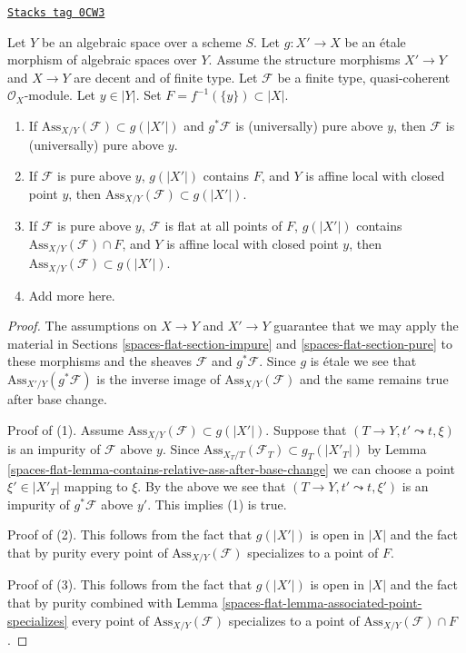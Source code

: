 \begin{lemma}
\label{spaces-flat-lemma-pure-on-top}
\href{https://stacks.math.columbia.edu/tag/0CW3}{\texttt{Stacks tag 0CW3}}

Let $Y$ be an algebraic space over a scheme $S$. Let $g : X' \to X$ be an
\'etale morphism of algebraic spaces over $Y$. Assume the structure
morphisms $X' \to Y$ and $X \to Y$ are decent and of finite type.
Let $\mathcal{F}$ be a finite type, quasi-coherent $\mathcal{O}_X$-module.
Let $y \in |Y|$. Set $F = f^{-1}(\{y\}) \subset |X|$.
\begin{enumerate}
\item If $\text{Ass}_{X/Y}(\mathcal{F}) \subset g(|X'|)$
and $g^*\mathcal{F}$ is (universally) pure above $y$, then
$\mathcal{F}$ is (universally) pure above $y$.
\item If $\mathcal{F}$ is pure above $y$, $g(|X'|)$ contains $F$, and
$Y$ is affine local with closed point $y$, then
$\text{Ass}_{X/Y}(\mathcal{F}) \subset g(|X'|)$.
\item If $\mathcal{F}$ is pure above $y$, $\mathcal{F}$ is flat
at all points of $F$, $g(|X'|)$ contains
$\text{Ass}_{X/Y}(\mathcal{F}) \cap F$, and $Y$ is affine local
with closed point $y$, then
$\text{Ass}_{X/Y}(\mathcal{F}) \subset g(|X'|)$.
\item Add more here.
\end{enumerate}
\end{lemma}

\begin{proof}
The assumptions on $X \to Y$ and $X' \to Y$ guarantee that
we may apply the material in Sections \ref{spaces-flat-section-impure} and
\ref{spaces-flat-section-pure}
to these morphisms and the sheaves $\mathcal{F}$ and $g^*\mathcal{F}$.
Since $g$ is \'etale we see that
$\text{Ass}_{X'/Y}(g^*\mathcal{F})$
is the inverse image of $\text{Ass}_{X/Y}(\mathcal{F})$
and the same remains true after base change.

\medskip\noindent
Proof of (1). Assume $\text{Ass}_{X/Y}(\mathcal{F}) \subset g(|X'|)$.
Suppose that $(T \to Y, t' \leadsto t, \xi)$
is an impurity of $\mathcal{F}$ above $y$. Since
$\text{Ass}_{X_T/T}(\mathcal{F}_T) \subset g_T(|X'_T|)$ by
Lemma \ref{spaces-flat-lemma-contains-relative-ass-after-base-change}
we can choose
a point $\xi' \in |X'_T|$ mapping to $\xi$. By the above we see
that $(T \to Y, t' \leadsto t, \xi')$ is an impurity of
$g^*\mathcal{F}$ above $y'$. This implies (1) is true.

\medskip\noindent
Proof of (2). This follows from the fact that $g(|X'|)$ is open
in $|X|$ and the fact that by purity every point of
$\text{Ass}_{X/Y}(\mathcal{F})$ specializes to a point of $F$.

\medskip\noindent
Proof of (3). This follows from the fact that $g(|X'|)$ is open
in $|X|$ and the fact that by purity combined with
Lemma \ref{spaces-flat-lemma-associated-point-specializes} every point of
$\text{Ass}_{X/Y}(\mathcal{F})$ specializes to a point of
$\text{Ass}_{X/Y}(\mathcal{F}) \cap F$.
\end{proof}

